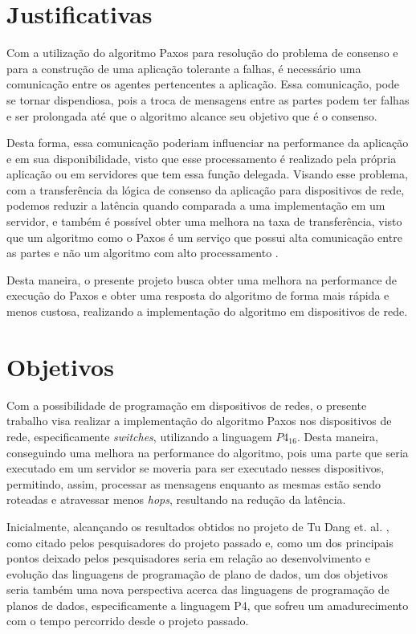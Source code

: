 \documentclass[12pt,
openright, 
oneside,
a4paper,
brazil]{facom-ufu-abntex2}
\theoremstyle{definition}
\begin{document}
\section{Justificativas}
Com a utilização do algoritmo Paxos para resolução do problema de consenso e para a 
construção de uma aplicação tolerante a falhas, é necessário uma comunicação entre os 
agentes pertencentes a aplicação. Essa comunicação, pode se tornar dispendiosa, pois 
a troca de mensagens entre as partes podem ter falhas e ser prolongada até que o 
algoritmo alcance seu objetivo que é o consenso.

Desta forma, essa comunicação poderiam influenciar na performance da aplicação e em 
sua disponibilidade, visto que esse processamento é realizado pela própria aplicação ou 
em servidores que tem essa função delegada. Visando esse problema, com a transferência
da lógica de consenso da aplicação para dispositivos de rede, podemos reduzir a latência
quando comparada a uma implementação em um servidor, e também é possível obter uma melhora
na taxa de transferência, visto que um algoritmo como o Paxos é um serviço que possui
alta comunicação entre as partes e não um algoritmo com alto processamento
\citep{netchainRtt}.

Desta maneira, o presente projeto busca obter uma melhora na performance de 
execução do Paxos e obter uma resposta do algoritmo de forma mais rápida e menos 
custosa, realizando a implementação do algoritmo em dispositivos de rede.

\section{Objetivos}
Com a possibilidade de programação em dispositivos de redes, o presente trabalho 
visa realizar a implementação do algoritmo Paxos nos dispositivos
de rede, especificamente \textit{switches}, utilizando a linguagem $P4_{16}$. 
Desta maneira, conseguindo uma melhora na performance do algoritmo, pois uma parte 
que seria executado em um servidor se moveria para ser executado nesses dispositivos, permitindo,
assim, processar as mensagens enquanto as mesmas estão sendo roteadas e atravessar menos
\textit{hops}, resultando na redução da latência.

Inicialmente, alcançando os resultados obtidos no projeto de Tu Dang et. al. 
\citep{dang2016paxos}, como citado pelos pesquisadores do projeto passado e, 
como um dos principais pontos deixado pelos pesquisadores seria em relação ao desenvolvimento
e evolução das linguagens de programação de plano de dados, um dos objetivos seria 
também uma nova perspectiva acerca das linguagens de programação de planos de dados, 
especificamente a linguagem P4, que sofreu um amadurecimento com o tempo percorrido 
desde o projeto passado.
\end{document}
